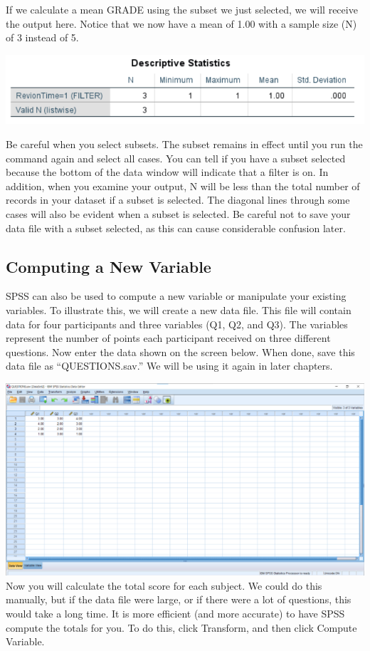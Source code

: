 \documentclass[
]{book}
\begin{document}
If we calculate a mean GRADE using the subset we just selected, we will receive the output here. Notice that we now have a mean of 1.00 with a sample size (N) of 3 instead of 5.

\includegraphics{Descriptive2.png}

Be careful when you select subsets. The subset remains in effect until you run the command again and select all cases. You can tell if you have a subset selected because the bottom of the data window will indicate that a filter is on. In addition, when you examine your output, N will be less than the total number of records in your dataset if a subset is selected. The diagonal lines through some cases will also be evident when a subset is selected. Be careful not to save your data file with a subset selected, as this can cause considerable confusion later.

\hypertarget{computing-a-new-variable}{%
\subsection{Computing a New Variable}\label{computing-a-new-variable}}

SPSS can also be used to compute a new variable or manipulate your existing variables. To illustrate this, we will create a new data file. This file will contain data for four participants and three variables (Q1, Q2, and Q3). The variables represent the number of points each participant received on three different questions. Now enter the data shown on the screen below. When done, save this data file as ``QUESTIONS.sav.'' We will be using it again in later chapters.

\includegraphics{QuestionData.png}
Now you will calculate the total score for each subject. We could do this manually, but if the data file were large, or if there were a lot of questions, this would take a long time. It is more efficient (and more accurate) to have SPSS compute the totals for you. To do this, click Transform, and then click Compute Variable.
\end{document}
